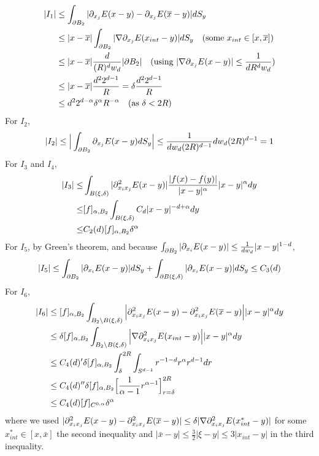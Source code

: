 \documentclass[12pt,a4paper]{article}
\newenvironment{proof}
{\begin{changemargin}{0.5cm}{0.5cm} 
	}%
	{\end{changemargin}
}
\newenvironment{p}
{\begin{proof} 
	}%
	{\end{proof}
}
\begin{document}
\begin{p}
\begin{align*}
|I_1| &\leq \int_{\partial B_2} |\partial_{x_j} E(x-y) - \partial_{x_j} E(\overline{x}-y)|dS_y \\
&\leq |x-\overline{x}|\int_{\partial B_2} |\nabla \partial_{x_j} E(x_{int} -y)| dS_y \quad (\text{some } x_{int} \in [x,\overline{x}]) \\
&\leq |x-\overline{x}| \frac{d}{(R)^d w_d} |\partial B_2| \quad (\text{using } |\nabla \partial_{x_j} E(x-y)|\leq \frac{1}{dR^d w_d}) \\
&\leq |x-\overline{x}| \frac{d^2 2^{d-1}}{R} = \delta \frac{d^2 2^{d-1}}{R} \\
&\leq d^2 2^{d-\alpha} \delta^{\alpha} R^{-\alpha} \quad (\text{as } \delta < 2R)
\end{align*}
For $I_2$,
\begin{align*}
|I_2| \leq \Big| \int_{\partial B_2} \partial_{x_j} E(x-y) dS_y \Big| \leq \frac{1}{dw_d (2R)^{d-1}} dw_d (2R)^{d-1} =1
\end{align*}
For $I_3$ and $I_4$,
\begin{align*}
|I_3| \leq &\int_{B(\xi, \delta)} |\partial_{x_i x_j}^2 E(x-y)| \frac{|f(x)-f(y)|}{|x-y|^{\alpha}} |x-y|^{\alpha} dy \\
\leq & [f]_{\alpha, B_2} \int_{B(\xi, \delta)} C_d|x-y|^{-d +\alpha} dy \\
\leq & C_2(d) [f]_{\alpha, B_2} \delta^{\alpha}
\end{align*}
For $I_5$, by Green's theorem, and because $\int_{\partial B_2} |\partial_{x_i} E(x-y) | \leq \frac{1}{dw_d}|x-y|^{1-d}$,
\begin{align*}
|I_5| \leq \int_{\partial B_2} |\partial_{x_i} E(x-y) | dS_y + \int_{\partial B(\xi, \delta)}| \partial_{x_i} E(x-y)|dS_y \leq C_3(d) 
\end{align*}
For $I_6$, 
\begin{align*}
|I_6| &\leq [f]_{\alpha, B_2} \int_{B_2 \backslash B(\xi, \delta)} \Big|\partial^2_{x_i x_j} E(x-y) -\partial^2_{x_i x_j} E(\overline{x}-y)\Big| |x-y|^{\alpha} dy \\
&\leq \delta[f]_{\alpha, B_2} \int_{B_2 \backslash B(\xi, \delta)} \Big| \nabla \partial_{x_i x_j}^2 E(x_{int} -y)\Big| |x-y|^{\alpha} dy \\
&\leq C_4(d)' \delta[f]_{\alpha, B_2} \int_{\delta}^{2R} \int_{S^{d-1}} r^{-1-d} r^{\alpha} r^{d-1} dr \\
&\leq C_4(d)'' \delta[f]_{\alpha, B_2}\Big[ \frac{1}{\alpha-1}r^{\alpha-1}\Big]_{r=\delta}^{2R} \\
&\leq C_4(d) [f]_{C^{0, \alpha}} \delta^{\alpha}
\end{align*}
where we used $|\partial^2_{x_i x_j} E(x-y) -\partial^2_{x_i x_j} E(\overline{x}-y)| \leq \delta |\nabla \partial_{x_i x_j}^2 E(x_{int}^* - y)|$ for some $x^*_{int} \in [x, \bar{x}]$ the second inequality and $|\bar{x}-y|\leq \frac{3}{2} |\xi -y| \leq 3|x_{int}-y|$ in the third inequality. 

\eop
\end{p}
\s
\end{document}
